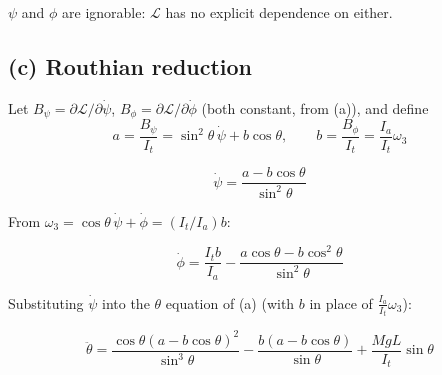 \documentclass[11pt]{article}
\begin{document}
\begin{result}
$\psi$ and $\phi$ are ignorable: $\mathcal L$ has no explicit dependence on either.
\end{result}

\subsection*{(c) Routhian reduction}

Let $B_\psi=\partial\mathcal L/\partial\dot\psi$, $B_\phi=\partial\mathcal L/\partial\dot\phi$ (both constant, from (a)), and define
\[
a=\frac{B_\psi}{I_t}=\sin^2\theta\,\dot\psi+b\cos\theta, \qquad
b=\frac{B_\phi}{I_t}=\frac{I_a}{I_t}\omega_3
\]

\begin{result}
\[
\dot\psi=\frac{a-b\cos\theta}{\sin^2\theta}
\]
\end{result}

From $\omega_3=\cos\theta\,\dot\psi+\dot\phi=(I_t/I_a)b$:

\begin{result}
\[
\dot\phi=\frac{I_tb}{I_a}-\frac{a\cos\theta-b\cos^2\theta}{\sin^2\theta}
\]
\end{result}

Substituting $\dot\psi$ into the $\theta$ equation of (a) (with $b$ in place of $\tfrac{I_a}{I_t}\omega_3$):

\begin{result}
\[
\ddot\theta=\frac{\cos\theta\left(a-b\cos\theta\right)^2}{\sin^3\theta}-\frac{b\left(a-b\cos\theta\right)}{\sin\theta}+\frac{MgL}{I_t}\sin\theta
\]
\end{result}
\end{document}
